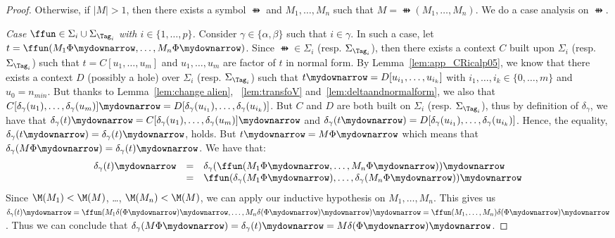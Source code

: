 \begin{proof}
\medskip{}

Otherwise, if $|M| > 1$, then there exists a symbol $\ffun$ and $M_1, \ldots,
M_n$ such that $M = \ffun(M_1, \ldots, M_n)$. We do a case analysis on $\ffun$.

\smallskip{}

\emph{Case $\ffun \in \Sigma_i\cup \Sigma_{\Tag_i}$ with $i \in \{ 1,
  \ldots, p\}$.} Consider $\gamma \in \{\alpha,\beta\}$ such that $i \in \gamma$. In such a case, let $t = \ffun(M_1\Phi\mydownarrow, \ldots,
M_n\Phi\mydownarrow)$. Since $\ffun \in \Sigma_i$ (resp. $\Sigma_{\Tag_i}$), then there exists a
context $C$ built upon $\Sigma_i$ (resp. $\Sigma_{\Tag_i}$) such that $t = C[u_1, \ldots, u_m]$ and
$u_1, \ldots, u_m$ are factor of $t$ in normal form. By
Lemma~\ref{lem:app_CRicalp05}, we know that there exists a context $D$ (possibly
a hole) over $\Sigma_i$ (resp. $\Sigma_{\Tag_i}$) such that $t\mydownarrow = D[u_{i_1}, \ldots,
u_{i_k}]$ with $i_1, \ldots, i_k \in \{0, \ldots, m\}$ and $u_0 = n_{min}$. But
thanks to Lemma~\ref{lem:change alien}, ~\ref{lem:transfoV} and~\ref{lem:deltaandnormalform}, we also that $C[\delta_\gamma(u_1), \ldots,
\delta_\gamma(u_m)]\mydownarrow = D[\delta_\gamma(u_{i_1}), \ldots,
\delta_\gamma(u_{i_k})]$. But $C$ and $D$ are both built on $\Sigma_i$ (resp. $\Sigma_{\Tag_i}$), thus by definition of $\delta_\gamma$, we have that
$\delta_\gamma(t)\mydownarrow = C[\delta_\gamma(u_1), \ldots,
\delta_\gamma(u_m)]\mydownarrow$ and $\delta_\gamma(t\mydownarrow) =
D[\delta_\gamma(u_{i_1}), \ldots, \delta_\gamma(u_{i_k})]$. Hence, the
equality, $\delta_\gamma(t\mydownarrow) = \delta_\gamma(t)\mydownarrow$,
holds. But $t\mydownarrow = M\Phi\mydownarrow$ which means that
$\delta_\gamma(M\Phi\mydownarrow) = \delta_\gamma(t)\mydownarrow$.
We have that:
 \[
\begin{array}{rcl}
\delta_\gamma(t)\mydownarrow &=&
\delta_\gamma(\ffun(M_1\Phi\mydownarrow, \ldots,
M_n\Phi\mydownarrow))\mydownarrow \\ &=&
\ffun(\delta_\gamma(M_1\Phi\mydownarrow), \ldots,
\delta_\gamma(M_n\Phi\mydownarrow))\mydownarrow
\end{array}
\]
Since $\M(M_1) <
\M(M)$, \ldots, $\M(M_n) < \M(M)$, we can apply our inductive hypothesis
on $M_1, \ldots, M_n$. This gives us $\delta_\gamma(t)\mydownarrow =
\ffun(M_1\delta(\Phi\mydownarrow)\mydownarrow, \ldots,
M_n\delta(\Phi\mydownarrow)\mydownarrow)\mydownarrow =  \ffun(M_1,\ldots,
M_n)\delta(\Phi\mydownarrow)\mydownarrow$. Thus we can conclude that
$\delta_\gamma(M\Phi\mydownarrow) = \delta_\gamma(t)\mydownarrow = M\delta(\Phi\mydownarrow)\mydownarrow$.


\end{proof}
